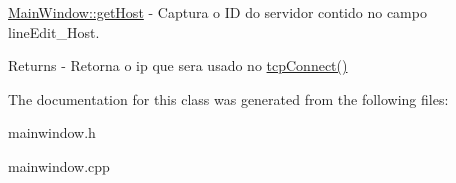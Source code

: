 \mbox{\hyperlink{class_main_window_a57a1f8959ed5f0eee73281829b2331fa}{Main\+Window\+::get\+Host}} -\/ Captura o ID do servidor contido no campo line\+Edit\+\_\+\+Host. 

\begin{DoxyReturn}{Returns}
-\/ Retorna o ip que sera usado no \mbox{\hyperlink{class_main_window_ac5b669957c442b6eb68573dacfce33e1}{tcp\+Connect()}} 
\end{DoxyReturn}


The documentation for this class was generated from the following files\+:\begin{DoxyCompactItemize}
\item 
mainwindow.\+h\item 
mainwindow.\+cpp\end{DoxyCompactItemize}
